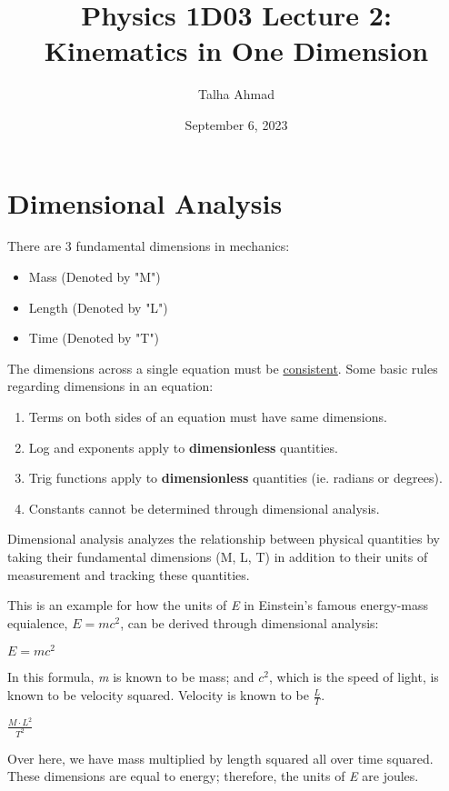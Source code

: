 \documentclass[12pt, letterpaper]{article}
\title{Physics 1D03 Lecture 2: Kinematics in One Dimension}
\author{Talha Ahmad}
\date{September 6, 2023}
\begin{document}
\maketitle

\section{Dimensional Analysis}

There are 3 fundamental dimensions in mechanics:

\begin{itemize}
	\item Mass (Denoted by "M")
	\item Length (Denoted by "L")
	\item Time (Denoted by "T")
\end{itemize}

The dimensions across a single equation must be \underline{consistent}.
Some basic rules regarding dimensions in an equation:

\begin{enumerate}
	\item Terms on both sides of an equation must have same dimensions.
	\item Log and exponents apply to \textbf{dimensionless} quantities.
	\item Trig functions apply to \textbf{dimensionless} quantities (ie. radians or degrees).
	\item Constants cannot be determined through dimensional analysis.
\end{enumerate}

Dimensional analysis analyzes the relationship between physical quantities by taking their
fundamental dimensions (M, L, T) in addition to their units of measurement and tracking these
quantities.

\bigskip

This is an example for how the units of \emph{E} in Einstein's famous energy-mass equialence,
$E = mc^2$, can be derived through dimensional analysis:

\begin{center}

	$E = mc^2$ 
	
	In this formula, \textit{m} is known to be mass; and $c^2$, which is the speed of light,
	is known to be velocity squared. Velocity is known to be $\frac{L}{T}$.

	\medskip

	\LARGE $\frac{M \cdot L^2}{T^2}$ \normalsize

	\bigskip

	Over here, we have mass multiplied by length squared all over time squared.
	These dimensions are equal to energy; therefore, the units of \textit{E}
	are joules.

\end{center}
\end{document}
